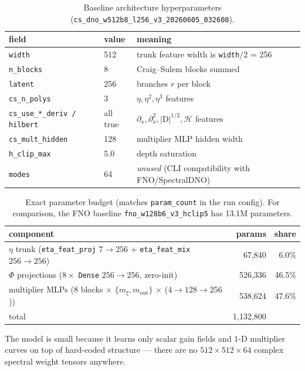 \documentclass[11pt,letterpaper]{article}
\newcommand{\Hil}{\mathcal{H}}
\newcommand{\D}{\mathrm{D}}
\begin{document}
\begin{table}[h]
\centering
\small
\begin{tabular}{llll}
\toprule
field & value & meaning \\
\midrule
\texttt{width}      & 512 & trunk feature width is \texttt{width}/2 = 256 \\
\texttt{n\_blocks}  & 8   & Craig--Sulem blocks summed \\
\texttt{latent}     & 256 & branches $r$ per block \\
\texttt{cs\_n\_polys} & 3 & $\eta, \eta^2, \eta^3$ features \\
\texttt{cs\_use\_*\_deriv / hilbert} & all true & $\partial_x, \partial_x^2, |\D|^{1/2}, \Hil$ features \\
\texttt{cs\_mult\_hidden} & 128 & multiplier MLP hidden width \\
\texttt{h\_clip\_max} & 5.0 & depth saturation \\
\texttt{modes} & 64 & \emph{unused} (CLI compatibility with FNO/SpectralDNO) \\
\bottomrule
\end{tabular}
\caption{Baseline architecture hyperparameters
(\texttt{cs\_dno\_w512b8\_l256\_v3\_20260605\_032608}).}
\end{table}

\begin{table}[h]
\centering
\small
\begin{tabular}{lrr}
\toprule
component & params & share \\
\midrule
$\eta$ trunk (\texttt{eta\_feat\_proj} $7{\to}256$ + \texttt{eta\_feat\_mix} $256{\to}256$) & 67{,}840 & 6.0\% \\
$\Phi$ projections ($8 \times$ \texttt{Dense} $256{\to}256$, zero-init) & 526{,}336 & 46.5\% \\
multiplier MLPs ($8$ blocks $\times$ $\{m_\xi, m_{\mathrm{out}}\}$ $\times$ ($4{\to}128{\to}256$)) & 538{,}624 & 47.6\% \\
\midrule
total & 1{,}132{,}800 & \\
\bottomrule
\end{tabular}
\caption{Exact parameter budget (matches \texttt{param\_count} in the run
config). For comparison, the FNO baseline \texttt{fno\_w128b6\_v3\_hclip5} has
13.1M parameters.}
\end{table}

The model is small because it learns only scalar gain fields and 1-D multiplier
curves on top of hard-coded structure --- there are no $512\times512\times64$
complex spectral weight tensors anywhere.
\end{document}
